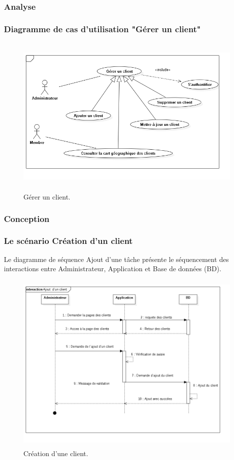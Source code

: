 
\subsubsection{Analyse}
\subsubsection{ Diagramme de cas d'utilisation "G\'{e}rer un client"}
\begin{figure}[H]
\center
\includegraphics[width=13cm,height=8cm]{./figures/ucC.png}
\caption{G\'{e}rer un client.}
\end{figure}

\subsubsection{Conception}
\subsubsection{Le sc\'{e}nario \guillemotleft{} Cr\'{e}ation d'un client\guillemotright{}}
Le diagramme de s\'{e}quence \guillemotleft{} Ajout d'une t\^{a}che \guillemotright{} pr\'{e}sente le s\'{e}quencement
des interactions entre Administrateur, Application et Base de donn\'{e}es (BD).

\begin{figure}[H]
\center
\includegraphics[width=14cm,height=9cm]{./figures/seq/F.png}
\caption{Cr\'{e}ation d'une client.}
\end{figure}



